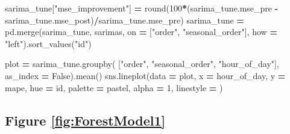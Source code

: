 \documentclass[mstat,12pt]{unswthesis}
\newenvironment{Shaded}{\begin{snugshade}}{\end{snugshade}}
\newcommand{\BuiltInTok}[1]{#1}
\newcommand{\DecValTok}[1]{\textcolor[rgb]{0.00,0.00,0.81}{#1}}
\newcommand{\NormalTok}[1]{#1}
\newcommand{\OperatorTok}[1]{\textcolor[rgb]{0.81,0.36,0.00}{\textbf{#1}}}
\newcommand{\StringTok}[1]{\textcolor[rgb]{0.31,0.60,0.02}{#1}}
\newcommand{\VariableTok}[1]{\textcolor[rgb]{0.00,0.00,0.00}{#1}}
\begin{document}
\begin{Shaded}
\begin{Highlighting}[]
\NormalTok{sarima\_tune[}\StringTok{"mse\_improvement"}\NormalTok{] }\OperatorTok{=} 
    \BuiltInTok{round}\NormalTok{(}\DecValTok{100}\OperatorTok{*}\NormalTok{(sarima\_tune.mse\_pre }\OperatorTok{{-}} 
\NormalTok{    sarima\_tune.mse\_post)}\OperatorTok{/}\NormalTok{sarima\_tune.mse\_pre)}
\NormalTok{sarima\_tune }\OperatorTok{=}\NormalTok{ pd.merge(sarima\_tune, sarimas, }
\NormalTok{    on }\OperatorTok{=}\NormalTok{ [}\StringTok{"order"}\NormalTok{, }\StringTok{"seasonal\_order"}\NormalTok{], }
\NormalTok{    how }\OperatorTok{=} \StringTok{"left"}\NormalTok{).sort\_values(}\StringTok{"id"}\NormalTok{)}

\NormalTok{plot }\OperatorTok{=}\NormalTok{ sarima\_tune.groupby(}
\NormalTok{    [}\StringTok{"order"}\NormalTok{, }\StringTok{"seasonal\_order"}\NormalTok{, }\StringTok{"hour\_of\_day"}\NormalTok{], }
\NormalTok{    as\_index }\OperatorTok{=} \VariableTok{False}\NormalTok{).mean()}
\NormalTok{sns.lineplot(data }\OperatorTok{=}\NormalTok{ plot, x }\OperatorTok{=} \StringTok{\textquotesingle{}hour\_of\_day\textquotesingle{}}\NormalTok{, y }\OperatorTok{=} \StringTok{\textquotesingle{}mape\textquotesingle{}}\NormalTok{, }
\NormalTok{    hue }\OperatorTok{=} \StringTok{\textquotesingle{}id\textquotesingle{}}\NormalTok{, palette }\OperatorTok{=} \StringTok{\textquotesingle{}pastel\textquotesingle{}}\NormalTok{, alpha }\OperatorTok{=} \DecValTok{1}\NormalTok{, linestyle }\OperatorTok{=} \StringTok{\textquotesingle{}{-}{-}\textquotesingle{}}\NormalTok{)}
\end{Highlighting}
\end{Shaded}

\subsection*{Figure \ref{fig:ForestModel1}}\label{figure-reffigforestmodel1}
\end{document}
